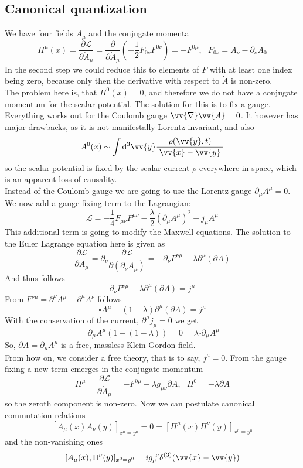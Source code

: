 \documentclass{include/thesisclass}
\newcommand{\LL}{\mathcal{L}}
\newcommand{\vx}{\vv{x}}
\newcommand{\vy}{\vv{y}}
\newcommand{\dd}{{\rm d}}
\newcommand{\p}{\partial}
\newcommand{\vn}{\vv{\nabla}}
\begin{document}
\subsection{Canonical quantization}
We have four fields $A_\mu$ and the conjugate momenta
\[ \Pi^\mu(x) = \frac{ \p \LL}{\p \dot A_\mu} = \frac{\p}{\p \dot A_\mu} \left( - \frac{1}{2} F_{0\nu}F^{0\nu}\right) = - F^{0 \mu}, ~~~ F_{0\nu} = \dot A _\nu - \p_\nu A_0 \]
In the second step we could reduce this to elements of $F$ with at least one index being zero, because only then the derivative with respect to $\dot A$ is non-zero.\\
The problem here is, that $\Pi^0(x) = 0$, and therefore we do not have a conjugate momentum for the scalar potential.
The solution for this is to fix a gauge. Everything works out for the Coulomb gauge $\vn \vv{A} = 0$. 
It however has major drawbacks, as it is not manifestally Lorentz invariant, and also 
\[A^0(x) \sim \int \dd ^3 \vv{y} \frac{\rho(\vv{y},t)}{| \vx - \vy|}\]
so the scalar potential is fixed by the scalar current $\rho$ everywhere in space, which is an apparent loss of causality.\\
Instead of the Coulomb gauge we are going to use the Lorentz gauge $\p_\mu A^\mu = 0$.
We now add a gauge fixing term to the Lagrangian:
\[ \LL = - \frac{1}{4} F_{\mu\nu}F^{\mu\nu} - \frac{\lambda}{2}( \p_\mu A^\mu) ^2 - j_\mu A^\mu\]
This additional term is going to modify the Maxwell equations. The solution to the Euler Lagrange equation here is given as
\[\frac{\p \LL}{\p A_\mu} = \p_\nu \frac{\p \LL}{\p(\p_\nu A_\mu)} = - \p_\nu F^{\nu\mu} - \lambda \p^\mu( \p A)\]
And thus follows
\[ \p_\nu F^{\nu\mu} - \lambda \p^\mu( \p A) = j^\mu\]
From $F^{\nu\mu} = \p^\nu A^\mu - \p^\mu A^\nu$ follows
\[ \square A^\mu - (1-\lambda)\p^\mu (\p A) = j^\mu\]
With the conservation of the current, $\p^\mu j_\mu = 0$ we get
\[ \square \p_\mu A^\mu (1 - (1- \lambda)) = 0 = \lambda \square \p_\mu A^\mu\]
So, $\p A = \p_\mu A^\mu$ is a free, massless Klein Gordon field.\\
From how on, we consider a free theory, that is to say, $j^\mu = 0$. From the gauge fixing a new term emerges in the conjugate momentum
\[ \Pi^\mu = \frac{\p \LL}{\p \dot A_\mu} = - F^{0\mu} - \lambda g_{\mu\nu} \p A, ~~~ \Pi^0 = - \lambda \p A\]
so the zeroth component is non-zero.
Now we can postulate canonical commutation relations
\[ [A_\mu(x) A_\nu(y)]_{x^0 = y^0} = 0 = [ \Pi^\mu(x) \Pi^\nu(y)]_{x^0 = y^0}\]
and the non-vanishing ones
\[ [A_\mu(x), \Pi^\nu(y)]_{x^0=y^0} = i g_\mu^{~\nu} \delta^{(3)}(\vx - \vy)\]
\end{document}
